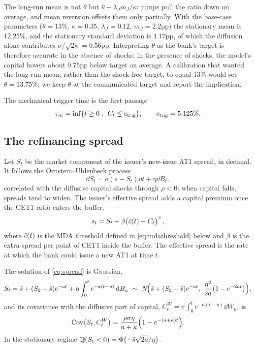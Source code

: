 \begin{remark}\label{rem:target}
The long-run mean is not $\theta$ but $\theta-\lambda_Jm_J/\kappa$: jumps pull the ratio
down on average, and mean reversion offsets them only partially. With the base-case
parameters ($\theta=13\%$, $\kappa=0.35$, $\lambda_J=0.12$, $m_J=2.2$pp) the stationary
mean is $12.25\%$, and the stationary standard deviation is $1.17$pp, of which the
diffusion alone contributes $\sigma/\sqrt{2\kappa}=0.56$pp. Interpreting $\theta$ as
the bank's target is therefore accurate in the absence of shocks; in the presence of
shocks, the model's capital hovers about $0.75$pp below target on average. A calibration
that wanted the long-run mean, rather than the shock-free target, to equal $13\%$ would set
$\theta=13.75\%$; we keep $\theta$ at the communicated target and report the implication.
\end{remark}

The mechanical trigger time is the first passage
\begin{equation}
  \tau_m = \inf\{t\ge0:\ C_t\le c_{\mathrm{trig}}\},\qquad c_{\mathrm{trig}}=5.125\%.
\end{equation}

\subsection{The refinancing spread}

Let $S_t$ be the market component of the issuer's new-issue AT1 spread, in decimal.
It follows the Ornstein--Uhlenbeck process
\begin{equation}\label{eq:spread}
  \dd S_t = a(\bar s-S_t)\dd t + \eta\dd B_t,
\end{equation}
correlated with the diffusive capital shocks through $\rho<0$: when capital falls,
spreads tend to widen. The issuer's effective spread adds a capital premium once the
CET1 ratio enters the buffer,
\begin{equation}\label{eq:seff}
  s_t = S_t + \beta\bigl(\bar c(t)-C_t\bigr)^+ ,
\end{equation}
where $\bar c(t)$ is the MDA threshold defined in \eqref{eq:mdathreshold} below and $\beta$
is the extra spread per point of CET1 inside the buffer. The effective spread is the rate
at which the bank could issue a new AT1 at time $t$.

\begin{proposition}\label{prop:spread}
The solution of \eqref{eq:spread} is Gaussian,
\begin{equation}
  S_t = \bar s + (S_0-\bar s)e^{-at} + \eta\int_0^te^{-a(t-u)}\,\mathrm{d} B_u
  \ \sim\ N\!\Bigl(\bar s + (S_0-\bar s)e^{-at},\ \frac{\eta^2}{2a}\bigl(1-e^{-2at}\bigr)\Bigr),
\end{equation}
and its covariance with the diffusive part of capital,
$C^W_t=\sigma\int_0^te^{-\kappa(t-u)}\dd W_u$, is
\begin{equation}\label{eq:covsc}
  \operatorname{Cov}\bigl(S_t,C^W_t\bigr) = \frac{\rho\sigma\eta}{a+\kappa}\Bigl(1-e^{-(a+\kappa)t}\Bigr).
\end{equation}
In the stationary regime $\mathbb{Q}(S_t<0)=\Phi\bigl(-\bar s\sqrt{2a}/\eta\bigr)$.
\end{proposition}

